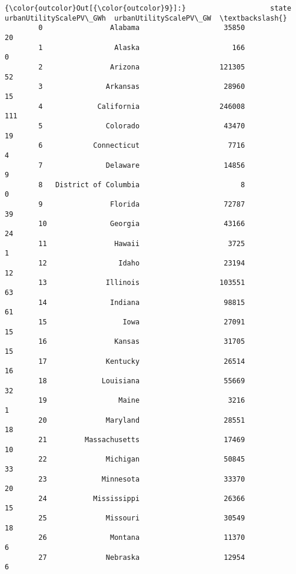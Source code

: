 \documentclass[11pt]{article}
\begin{document}
\begin{Verbatim}[commandchars=\\\{\}]
{\color{outcolor}Out[{\color{outcolor}9}]:}                    state  urbanUtilityScalePV\_GWh  urbanUtilityScalePV\_GW  \textbackslash{}
        0                Alabama                    35850                      20   
        1                 Alaska                      166                       0   
        2                Arizona                   121305                      52   
        3               Arkansas                    28960                      15   
        4             California                   246008                     111   
        5               Colorado                    43470                      19   
        6            Connecticut                     7716                       4   
        7               Delaware                    14856                       9   
        8   District of Columbia                        8                       0   
        9                Florida                    72787                      39   
        10               Georgia                    43166                      24   
        11                Hawaii                     3725                       1   
        12                 Idaho                    23194                      12   
        13              Illinois                   103551                      63   
        14               Indiana                    98815                      61   
        15                  Iowa                    27091                      15   
        16                Kansas                    31705                      15   
        17              Kentucky                    26514                      16   
        18             Louisiana                    55669                      32   
        19                 Maine                     3216                       1   
        20              Maryland                    28551                      18   
        21         Massachusetts                    17469                      10   
        22              Michigan                    50845                      33   
        23             Minnesota                    33370                      20   
        24           Mississippi                    26366                      15   
        25              Missouri                    30549                      18   
        26               Montana                    11370                       6   
        27              Nebraska                    12954                       6   

\end{Verbatim}
\end{document}
